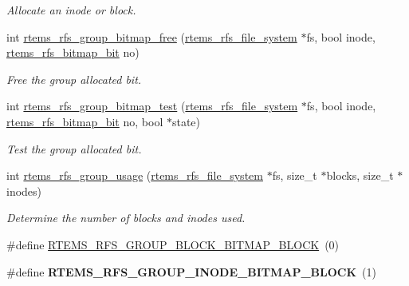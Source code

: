 \begin{DoxyCompactItemize}
\begin{DoxyCompactList}\small\item\em Allocate an inode or block. \end{DoxyCompactList}\item 
int \mbox{\hyperlink{group__rtems__rfs_ga00a3fb9f49f96fbef91adf13ae1622b7}{rtems\+\_\+rfs\+\_\+group\+\_\+bitmap\+\_\+free}} (\mbox{\hyperlink{struct__rtems__rfs__file__system}{rtems\+\_\+rfs\+\_\+file\+\_\+system}} $\ast$fs, bool inode, \mbox{\hyperlink{rtems-rfs-bitmaps_8h_acc1b0aefe1b090890ccbc1b05279a78e}{rtems\+\_\+rfs\+\_\+bitmap\+\_\+bit}} no)
\begin{DoxyCompactList}\small\item\em Free the group allocated bit. \end{DoxyCompactList}\item 
int \mbox{\hyperlink{group__rtems__rfs_ga5d4dab0178595df6610b29601dd67a01}{rtems\+\_\+rfs\+\_\+group\+\_\+bitmap\+\_\+test}} (\mbox{\hyperlink{struct__rtems__rfs__file__system}{rtems\+\_\+rfs\+\_\+file\+\_\+system}} $\ast$fs, bool inode, \mbox{\hyperlink{rtems-rfs-bitmaps_8h_acc1b0aefe1b090890ccbc1b05279a78e}{rtems\+\_\+rfs\+\_\+bitmap\+\_\+bit}} no, bool $\ast$state)
\begin{DoxyCompactList}\small\item\em Test the group allocated bit. \end{DoxyCompactList}\item 
int \mbox{\hyperlink{group__rtems__rfs_ga6f33253a6d629c7c2300b82fb21c4558}{rtems\+\_\+rfs\+\_\+group\+\_\+usage}} (\mbox{\hyperlink{struct__rtems__rfs__file__system}{rtems\+\_\+rfs\+\_\+file\+\_\+system}} $\ast$fs, size\+\_\+t $\ast$blocks, size\+\_\+t $\ast$inodes)
\begin{DoxyCompactList}\small\item\em Determine the number of blocks and inodes used. \end{DoxyCompactList}\item 
\#define \mbox{\hyperlink{group__rtems__rfs_gae19b35893a0007cd08b549200e317b9e}{R\+T\+E\+M\+S\+\_\+\+R\+F\+S\+\_\+\+G\+R\+O\+U\+P\+\_\+\+B\+L\+O\+C\+K\+\_\+\+B\+I\+T\+M\+A\+P\+\_\+\+B\+L\+O\+CK}}~(0)
\item 
\mbox{\label{group__rtems__rfs_ga7ab8d916db406c7c7a5397ca385a2e1b}} 
\#define {\bfseries R\+T\+E\+M\+S\+\_\+\+R\+F\+S\+\_\+\+G\+R\+O\+U\+P\+\_\+\+I\+N\+O\+D\+E\+\_\+\+B\+I\+T\+M\+A\+P\+\_\+\+B\+L\+O\+CK}~(1)
\item 
\mbox{\label{group__rtems__rfs_ga1c17807e950b523eac8e7ee924d8dabd}} 

\end{DoxyCompactItemize}
